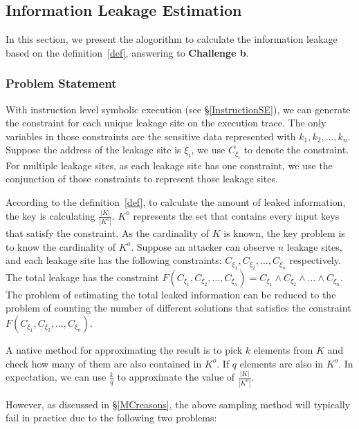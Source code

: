 \subsection{Information Leakage Estimation}

\newcommand{\addr}[1]{{l}_{#1}}
\renewcommand{\addr}[1]{{\gamma}_{#1}}
\renewcommand{\addr}[1]{{\zeta}_{#1}}
\renewcommand{\addr}[1]{{\xi}_{#1}}

In this section, we present the alogorithm to calculate the information
leakage based on the definition~\ref{def}, answering to
\textbf{Challenge b}. 

\subsubsection{Problem Statement}
With instruction level symbolic execution (see \S\ref{InstructionSE}), we can generate the constraint 
for each unique leakage site on the execution trace.
The only variables in those constraints are the sensitive data represented
with $k_1, k_2, \ldots , k_n$. Suppose the address of the leakage site is $\addr{i}$,
we use $C_{\addr{i}}$ to denote the constraint. For multiple leakage sites, 
as each leakage site has one constraint, we 
use the conjunction of those constraints to represent those leakage sites. 

According to the definition~\ref{def}, to calculate the amount of leaked 
information, the key is calculating $\frac{|K|}{|K^o|}$. $K^o$ represents
the set that contains every input keys that satisfy the constraint. As the 
cardinality of $K$ is known, the key problem is to know the cardinality of
$K^o$. Suppose an attacker can observe $n$ leakage sites, and each leakage site has
the following constraints: $C_{\addr{1}}, C_{\addr{2}}, \ldots, C_{\addr{n}}$ respectively. 
The total leakage has the constraint 
$F(C_{\addr{1}},C_{\addr{2}},\ldots,C_{\addr{n}}) = C_{\addr{1}} \land C_{\addr{2}} 
\land \ldots \land C_{\addr{n}}$. The problem of estimating the total leaked information 
can be reduced to the problem of counting the number of different solutions 
that satisfies the constraint $F(C_{\addr{1}},C_{\addr{2}},\ldots,C_{\addr{n}})$. 

A native method for approximating 
the result is to pick $k$ elements from $K$ and check how many of them are also
contained in $K^o$. If $q$ elements are also in $K^o$. In expectation, we can
use $\frac{k}{q}$ to approximate the value of $\frac{|K|}{|K^o|}$.

However, as discussed in \S\ref{MCreasons},
the above sampling method will typically fail in practice due to the following two problems:

